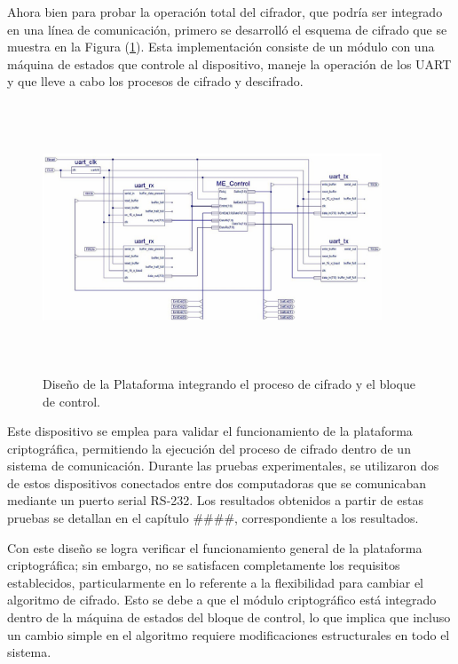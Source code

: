 Ahora bien para probar la operación total del cifrador, que podría ser integrado en una línea de comunicación, primero se desarrolló el esquema de cifrado que se muestra en la Figura (\ref{fig:imagen6}). Esta implementación consiste de un módulo con una máquina de estados que controle al dispositivo, maneje la operación de los UART y que lleve a cabo los procesos de cifrado y descifrado. 

\begin{figure}[h!] %
    \centering %
     \includegraphics[width=0.9\textwidth, height=8cm]{imagenes/img6} %
    \caption{Diseño de la Plataforma integrando el proceso de cifrado y el bloque de control.}
    \label{fig:imagen6} %
\end{figure} 

Este dispositivo se emplea para validar el funcionamiento de la plataforma criptográfica, permitiendo la ejecución del proceso de cifrado dentro de un sistema de comunicación. Durante las pruebas experimentales, se utilizaron dos de estos dispositivos conectados entre dos computadoras que se comunicaban mediante un puerto serial RS-232. Los resultados obtenidos a partir de estas pruebas se detallan en el capítulo \#\#\#\#, correspondiente a los resultados.

Con este diseño se logra verificar el funcionamiento general de la plataforma criptográfica; sin embargo, no se satisfacen completamente los requisitos establecidos, particularmente en lo referente a la flexibilidad para cambiar el algoritmo de cifrado. Esto se debe a que el módulo criptográfico está integrado dentro de la máquina de estados del bloque de control, lo que implica que incluso un cambio simple en el algoritmo requiere modificaciones estructurales en todo el sistema.

